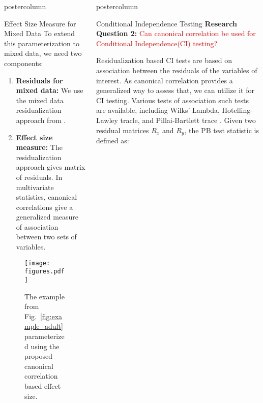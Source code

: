 \documentclass{beamer}
\newlength{\columnheight}
\begin{document}
\begin{frame}
\begin{columns}
	\begin{column}{.33\textwidth}
		\begin{beamercolorbox}[center]{postercolumn}
			\begin{minipage}{.98\textwidth} %
				\parbox[t][\columnheight]{\textwidth}{ %
	\begin{myblock}{Effect Size Measure for Mixed Data}
		To extend this parameterization to mixed data, we need two components:

		\begin{enumerate}
			\item \textbf{Residuals for mixed data:} We use the mixed data residualization approach from \citet{Ankan2023}.
			\item \textbf{Effect size measure:} The residualization approach gives matrix of residuals. In multivariate statistics, canonical 
				correlations give a generalized measure of association between two sets of variables.
		\end{enumerate}

		\begin{figure}
			\texttt{[image: figures.pdf]}
			\caption{The example from Fig.~\ref{fig:example_adult} parameterized using the proposed canonical correlation based effect size.}
		\end{figure}
	\end{myblock}\vfill
		}\end{minipage}\end{beamercolorbox}
	\end{column}


	\begin{column}{0.33\textwidth}
		\begin{beamercolorbox}[center]{postercolumn}
			\begin{minipage}{.98\textwidth} %
				\parbox[t][\columnheight]{\textwidth}{ %
	\begin{myblock}{Conditional Independence Testing}
		\textbf{Research Question 2:} \textcolor{red}{Can canonical correlation be used for Conditional Independence(CI) testing?}
		\vspace{1em}

		Residualization based CI tests are based on association between the residuals of the variables of interest. As canonical correlation provides 
		a generalized way to assess that, we can utilize it for CI testing. Various tests of association 
		such tests are available, including Wilks' Lambda, Hotelling-Lawley tracle, and Pillai-Bartlett trace \citep{Pillai1955}. Given two residual 
		matrices $ R_x $ and $ R_y $, the PB test statistic is defined as:


\end{myblock}}
\end{minipage}
\end{beamercolorbox}
\end{column}
\end{columns}
\end{frame}
\end{document}

